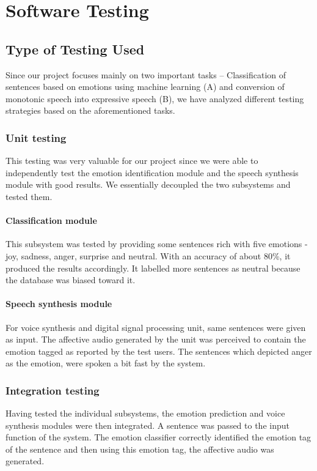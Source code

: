 \documentclass[oneside,a4paper,12pt]{book}
\begin{document}
\chapter{Software Testing}
\section{Type of Testing Used}
Since our project focuses mainly on two important tasks – Classification of sentences based on emotions using machine learning (A) and conversion of monotonic speech into expressive speech (B), we have analyzed different testing strategies based on the aforementioned tasks.
\subsection{Unit testing}
This testing was very valuable for our project since we were able to independently test the emotion identification module and the speech synthesis module with good results. We essentially decoupled the two subsystems and tested them.
\subsubsection{Classification module}
This subsystem was tested by providing some sentences rich with five emotions - joy, sadness, anger,  surprise and neutral. With an accuracy of about 80\%, it produced the results accordingly. It labelled more sentences as neutral because the database was biased toward it.

\subsubsection{Speech synthesis module} 
For voice synthesis and digital signal processing unit, same sentences were given as input. The affective audio generated by the unit was perceived to contain the emotion tagged as reported by the test users. The sentences which depicted anger as the emotion, were spoken a bit fast by the system.

\subsection{Integration testing}
Having tested the individual subsystems, the emotion prediction and voice synthesis modules were then integrated. A sentence was passed to the input function of the system. The emotion classifier correctly identified the emotion tag of the sentence and then using this emotion tag, the affective audio was generated.
\end{document}
